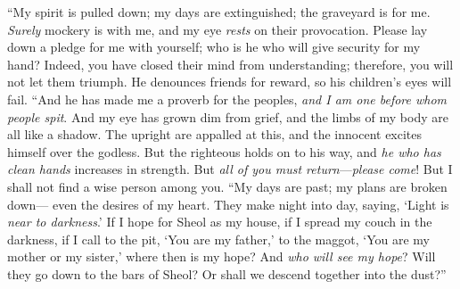 \begin{biblechapter} %
 “My spirit is pulled down; my days are extinguished; 
the graveyard is for me.
\verse \textit{Surely} mockery is with me, 
and my eye \textit{rests} on their provocation.
\verse Please lay down a pledge for me with yourself; 
who is he who will give security for my hand?
\verse Indeed, you have closed their mind from understanding; 
therefore, you will not let them triumph.
\verse He denounces friends for reward, 
so his children’s eyes will fail.
\verse “And he has made me a proverb for the peoples, 
\textit{and I am one before whom people spit}.
\verse And my eye has grown dim from grief, 
and the limbs of my body are all like a shadow.
\verse The upright are appalled at this, 
and the innocent excites himself over the godless.
\verse But the righteous holds on to his way, 
and \textit{he who has clean hands} increases in strength.
\verse But \textit{all of you must return}—\textit{please come}! 
But I shall not find a wise person among you.
\verse “My days are past; my plans are broken down— 
even the desires of my heart.
\verse They make night into day, 
saying, ‘Light is \textit{near to darkness}.’
\verse If I hope for Sheol as my house, 
if I spread my couch in the darkness,
\verse if I call to the pit, ‘You are my father,’ 
to the maggot, ‘You are my mother or my sister,’
\verse where then is my hope? 
And \textit{who will see my hope}?
\verse Will they go down to the bars of Sheol? 
Or shall we descend together into the dust?”
\end{biblechapter}

